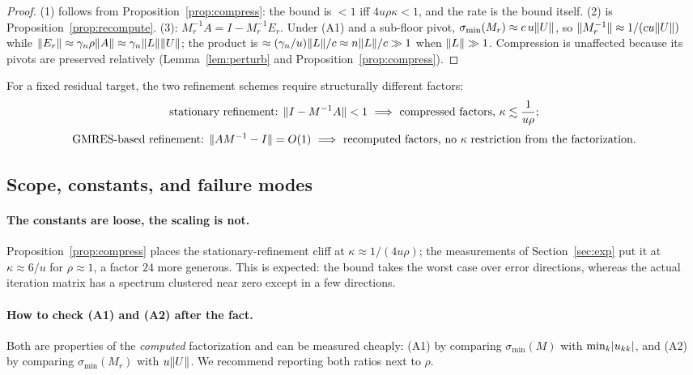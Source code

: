 \begin{proof}
(1) follows from Proposition~\ref{prop:compress}: the bound is $<1$ iff
$4u\rho\kappa<1$, and the rate is the bound itself.
(2) is Proposition~\ref{prop:recompute}.
(3): $M_r^{-1}A=I-M_r^{-1}E_r$. Under (A1) and a sub-floor pivot,
$\sigma_{\min}(M_r)\approx c\,u\lVert U \rVert$, so
$\lVert M_r^{-1} \rVert\approx1/(cu\lVert U \rVert)$ while
$\lVert E_r \rVert\approx\gamma_n\rho\lVert A \rVert\approx\gamma_n\lVert L \rVert\lVert U \rVert$; the
product is $\approx(\gamma_n/u)\lVert L \rVert/c\approx n\lVert L \rVert/c\gg1$ when
$\lVert L \rVert\gg1$. Compression is unaffected because its pivots are preserved
relatively (Lemma~\ref{lem:perturb} and Proposition~\ref{prop:compress}).
\end{proof}

\begin{corollary}\label{cor:sets}
For a fixed residual target, the two refinement schemes require structurally
different factors:
\[
  \text{stationary refinement: } \lVert I-M^{-1}A \rVert<1
  \ \Longrightarrow\ \text{compressed factors, } \kappa\lesssim\frac{1}{u\rho};
\]
\[
  \text{GMRES-based refinement: } \lVert AM^{-1}-I \rVert=O(1)
  \ \Longrightarrow\ \text{recomputed factors, no }\kappa\text{ restriction
  from the factorization.}
\]
\end{corollary}

\subsection{Scope, constants, and failure modes}

\paragraph{The constants are loose, the scaling is not.}
Proposition~\ref{prop:compress} places the stationary-refinement cliff at
$\kappa\approx1/(4u\rho)$; the measurements of Section~\ref{sec:exp} put it at
$\kappa\approx6/u$ for $\rho\approx1$, a factor $24$ more generous. This is
expected: the bound takes the worst case over error directions, whereas the
actual iteration matrix has a spectrum clustered near zero except in a few
directions.

\paragraph{How to check (A1) and (A2) after the fact.}
Both are properties of the \emph{computed} factorization and can be measured
cheaply: (A1) by comparing $\sigma_{\min}(M)$ with $\min_k\lvert u_{kk} \rvert$, and
(A2) by comparing $\sigma_{\min}(M_r)$ with $u\lVert U \rVert$. We recommend reporting
both ratios next to $\rho$.

